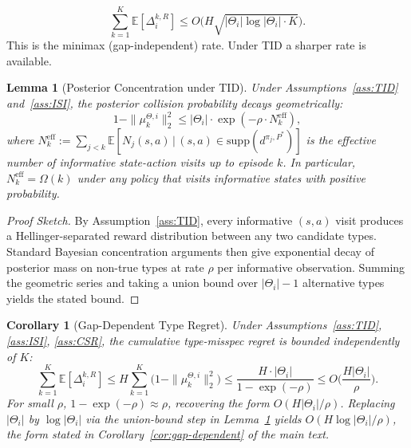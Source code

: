 \documentclass{article}
\newtheorem{lemma}[theorem]{Lemma}
\newtheorem{corollary}[theorem]{Corollary}
\begin{document}
\begin{equation}
\sum_{k=1}^K \mathbb{E}[\Delta_i^{k,R}] \leq O\big(H \sqrt{|\Theta_i| \log|\Theta_i| \cdot K}\big).
\end{equation}
This is the minimax (gap-independent) rate. Under TID a sharper rate is available.

\begin{lemma}[Posterior Concentration under TID]
\label{lem:posterior-concentration}
Under Assumptions~\ref{ass:TID} and~\ref{ass:ISI}, the posterior collision probability decays geometrically:
\begin{equation}
1 - \|\mu_k^{\Theta,i}\|_2^2 \leq |\Theta_i| \cdot \exp(-\rho \cdot N_k^{\mathrm{eff}}),
\end{equation}
where $N_k^{\mathrm{eff}} := \sum_{j < k} \mathbb{E}[N_j(s, a) \,\big|\, (s, a) \in \mathrm{supp}(d^{\pi_j, P^*})]$ is the effective number of informative state-action visits up to episode $k$. In particular, $N_k^{\mathrm{eff}} = \Omega(k)$ under any policy that visits informative states with positive probability.
\end{lemma}

\begin{proof}[Proof Sketch]
By Assumption~\ref{ass:TID}, every informative $(s, a)$ visit produces a Hellinger-separated reward distribution between any two candidate types. Standard Bayesian concentration arguments \citep[Theorem 4.2]{ghosal2007convergence} then give exponential decay of posterior mass on non-true types at rate $\rho$ per informative observation. Summing the geometric series and taking a union bound over $|\Theta_i| - 1$ alternative types yields the stated bound.
\end{proof}

\begin{corollary}[Gap-Dependent Type Regret]
\label{cor:gap-dependent-appendix}
Under Assumptions~\ref{ass:TID}, \ref{ass:ISI}, \ref{ass:CSR}, the cumulative type-misspec regret is bounded independently of $K$:
\begin{equation}
\sum_{k=1}^K \mathbb{E}[\Delta_i^{k,R}] \leq H \sum_{k=1}^K \big(1 - \|\mu_k^{\Theta,i}\|_2^2\big) \leq \frac{H \cdot |\Theta_i|}{1 - \exp(-\rho)} \leq O\bigg(\frac{H |\Theta_i|}{\rho}\bigg).
\end{equation}
For small $\rho$, $1 - \exp(-\rho) \approx \rho$, recovering the form $O(H |\Theta_i|/\rho)$. Replacing $|\Theta_i|$ by $\log|\Theta_i|$ via the union-bound step in Lemma~\ref{lem:posterior-concentration} yields $O(H \log|\Theta_i|/\rho)$, the form stated in Corollary~\ref{cor:gap-dependent} of the main text.
\end{corollary}
\end{document}
